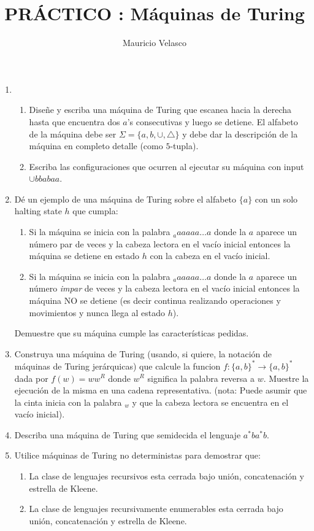 \documentclass[12pt, a4paper]{article}
\date{}
\begin{document}
\title{PRÁCTICO : Máquinas de Turing}
\author{Mauricio Velasco}
\maketitle{}
\begin{enumerate}
\item \begin{enumerate}
\item Diseñe y escriba una máquina de Turing que escanea hacia la derecha hasta que encuentra dos $a$'s consecutivas y luego se detiene. El alfabeto de la máquina debe ser $\Sigma =\{a,b,\cup,\triangle\}$ y debe dar la descripción de la máquina en completo detalle (como $5$-tupla).
\item Escriba las configuraciones que ocurren al ejecutar su máquina con input $\cup bbabaa$.
\end{enumerate}


\item Dé un ejemplo de una máquina de Turing sobre el alfabeto $\{a\}$ con un solo halting state $h$ que cumpla:
\begin{enumerate}
\item Si la máquina se inicia con la palabra $_aaaaaa\dots a$ donde la $a$ aparece un número par de veces y la cabeza lectora en el vacío inicial entonces la máquina se detiene en estado $h$ con la cabeza en el vacío inicial.
\item Si la máquina se inicia con la palabra $_aaaaaa\dots a$ donde la $a$ aparece un número \emph{impar} de veces y la cabeza lectora en el vacío inicial entonces la máquina NO se detiene (es decir continua realizando operaciones y movimientos y nunca llega al estado $h$).
\end{enumerate}
Demuestre que su máquina cumple las características pedidas.


\item Construya una máquina de Turing (usando, si quiere, la notación de máquinas de Turing jerárquicas) que calcule la funcion $f: \{a,b\}^*\rightarrow \{a,b\}^*$ dada por $f(w)=ww^R$ donde $w^R$ significa la palabra reversa a $w$. Muestre la ejecución de la misma en una cadena representativa. (nota: Puede asumir que la cinta inicia con la palabra $_w$ y que la cabeza lectora se encuentra en el vacío inicial).


\item Describa una máquina de Turing que semidecida el lenguaje $a^*ba^*b$.

\item Utilice máquinas de Turing no deterministas para demostrar que:
\begin{enumerate}
\item La clase de lenguajes recursivos esta cerrada bajo unión, concatenación y estrella de Kleene.
\item La clase de lenguajes recursivamente enumerables esta cerrada bajo unión, concatenación y estrella de Kleene.

\end{enumerate}



\end{enumerate}
\end{document}
